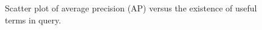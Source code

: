 \begin{figure}[t!]
\begin{centering}
6cm]{figs/greaterthan10-p.eps}}
\par\end{centering}

\protect\caption{Scatter plot of average precision (AP) versus the existence of useful terms in query.}
\label{fig:overlap-p}
\end{figure}
